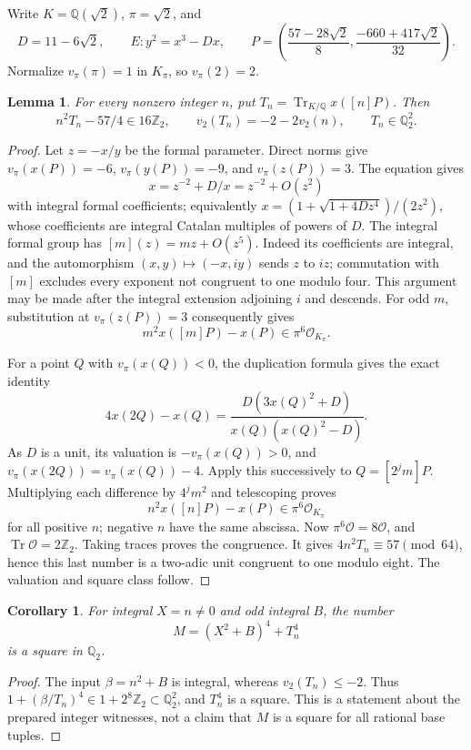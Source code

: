 \documentclass[11pt]{article}
\newtheorem{lemma}[theorem]{Lemma}
\newtheorem{corollary}[theorem]{Corollary}
\newcommand{\Q}{\mathbb Q}\newcommand{\Z}{\mathbb Z}
\newcommand{\Tr}{\operatorname{Tr}}\newcommand{\Nm}{\operatorname{Nm}}
\begin{document}
Write $K=\Q(\sqrt2)$, $\pi=\sqrt2$, and
\[
 D=11-6\sqrt2,\qquad E:y^2=x^3-Dx,\qquad
 P=\left(\frac{57-28\sqrt2}{8},\frac{-660+417\sqrt2}{32}\right).
\]
Normalize $v_\pi(\pi)=1$ in $K_\pi$, so $v_\pi(2)=2$.
\begin{lemma}\label{lem:trace}
For every nonzero integer $n$, put $T_n=\Tr_{K/\Q}x([n]P)$.
Then
\[
 n^2T_n-57/4\in16\Z_2,
 \qquad v_2(T_n)=-2-2v_2(n),\qquad T_n\in\Q_2^2.
\]
\end{lemma}
\begin{proof}
Let $z=-x/y$ be the formal parameter. Direct norms give
$v_\pi(x(P))=-6$, $v_\pi(y(P))=-9$, and $v_\pi(z(P))=3$.
The equation gives
\[
 x=z^{-2}+D/x=z^{-2}+O(z^2)
\]
with integral formal coefficients; equivalently
$x=(1+\sqrt{1+4Dz^4})/(2z^2)$, whose coefficients are integral
Catalan multiples of powers of $D$.
The integral formal group has $[m](z)=mz+O(z^5)$.
Indeed its coefficients are integral, and the automorphism
$(x,y)\mapsto(-x,iy)$ sends $z$ to $iz$; commutation with $[m]$
excludes every exponent not congruent to one modulo four. This argument
may be made after the integral extension adjoining $i$ and descends.
For odd $m$, substitution at $v_\pi(z(P))=3$ consequently gives
\[
 m^2x([m]P)-x(P)\in\pi^6\mathcal O_{K_\pi}.
\]

For a point $Q$ with $v_\pi(x(Q))<0$, the duplication formula gives
the exact identity
\[
 4x(2Q)-x(Q)
   =\frac{D(3x(Q)^2+D)}{x(Q)(x(Q)^2-D)}.
\]
As $D$ is a unit, its valuation is $-v_\pi(x(Q))>0$, and
$v_\pi(x(2Q))=v_\pi(x(Q))-4$. Apply this successively to
$Q=[2^jm]P$. Multiplying each difference by $4^jm^2$ and
telescoping proves
\[
 n^2x([n]P)-x(P)\in\pi^6\mathcal O_{K_\pi}
\]
for all positive $n$; negative $n$ have the same abscissa.
Now $\pi^6\mathcal O=8\mathcal O$, and
$\Tr\mathcal O=2\Z_2$. Taking traces proves the congruence.
It gives $4n^2T_n\equiv57\pmod {64}$, hence this last number is a
two-adic unit congruent to one modulo eight. The valuation and square
class follow.
\end{proof}

\begin{corollary}\label{cor:scale}
For integral $X=n\ne0$ and odd integral $B$, the number
\[
 M=(X^2+B)^4+T_n^4
\]
is a square in $\Q_2$.
\end{corollary}
\begin{proof}
The input $\beta=n^2+B$ is integral, whereas $v_2(T_n)\le-2$.
Thus $1+(\beta/T_n)^4\in1+2^8\Z_2\subset\Q_2^2$, and
$T_n^4$ is a square. This is a statement about the prepared integer
witnesses, not a claim that $M$ is a square for all rational base tuples.
\end{proof}
\end{document}
